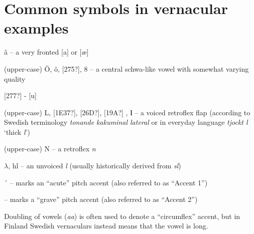 
\chapter[Common symbols in vernacular examples]{\rmfamily Common symbols in vernacular examples}
\label{bkm:Ref224104485}

â – a very fronted [a] or [æ]

(upper-case) Ö, ô, [275?], \textsc{8  }\textsc{–}\textsc{ }a central schwa-like vowel with somewhat varying quality

[277?] - [u]

(upper-case) L, [1E37?], [26D?], [19A?] , \textbf{l }– a voiced retroflex flap (according to Swedish terminology \textit{tonande kakuminal lateral} or in everyday language \textit{tjockt l} ‘thick \textit{l}’)

(upper-case) N – a retroflex \textit{n}

$\lambda $, hl – an unvoiced \textit{l } (usually historically derived from \textit{sl})

´  – marks an “acute” pitch accent (also referred to as “Accent 1”)

{\textasciigrave} – marks a “grave” pitch accent (also referred to as “Accent 2”)

Doubling of vowels (\textit{aa}) is often used to denote a “circumflex” accent, but in Finland Swedish vernaculars instead means that the vowel is long.
